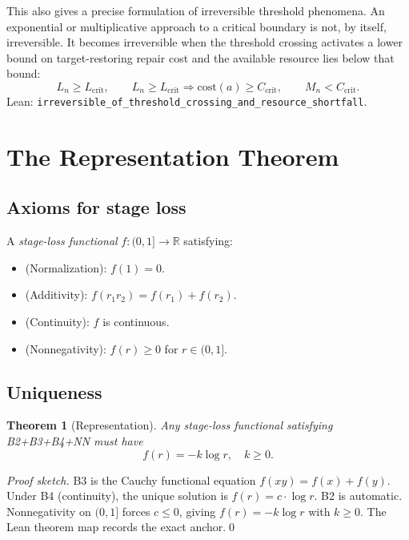 \documentclass[11pt,a4paper]{article}
\newtheorem{theorem}{Theorem}[section]
\begin{document}
This also gives a precise formulation of irreversible threshold phenomena.
An exponential or multiplicative approach to a critical boundary is not, by
itself, irreversible. It becomes irreversible when the threshold crossing
activates a lower bound on target-restoring repair cost and the available
resource lies below that bound:
\[
L_n\geq L_{\mathrm{crit}},\qquad
L_n\geq L_{\mathrm{crit}}\Rightarrow
  \mathrm{cost}(a)\geq C_{\mathrm{crit}},\qquad
M_n<C_{\mathrm{crit}}.
\]
Lean: \texttt{irreversible\_of\_threshold\_crossing\_and\_resource\_shortfall}.

\section{The Representation Theorem}\label{sec:representation}

\subsection{Axioms for stage loss}

A \emph{stage-loss functional} $f \colon (0,1] \to \mathbb{R}$ satisfying:
\begin{itemize}
\item[\textbf{B2}] (Normalization): $f(1) = 0$.
\item[\textbf{B3}] (Additivity): $f(r_1 r_2) = f(r_1) + f(r_2)$.
\item[\textbf{B4}] (Continuity): $f$ is continuous.
\item[\textbf{NN}] (Nonnegativity): $f(r) \geq 0$ for $r \in (0,1]$.
\end{itemize}

\subsection{Uniqueness}

\begin{theorem}[Representation]\label{thm:representation}
Any stage-loss functional satisfying B2+B3+B4+NN must have
\[
f(r) = -k\log r, \quad k \geq 0.
\]
\end{theorem}

\begin{proof}[Proof sketch]
B3 is the Cauchy functional equation $f(xy) = f(x) + f(y)$. Under B4 (continuity), the unique solution is $f(r) = c \cdot \log r$. B2 is automatic. Nonnegativity on $(0,1]$ forces $c \leq 0$, giving $f(r) = -k\log r$ with $k \geq 0$. The Lean theorem map records the exact anchor.\qed
\end{proof}
\end{document}
